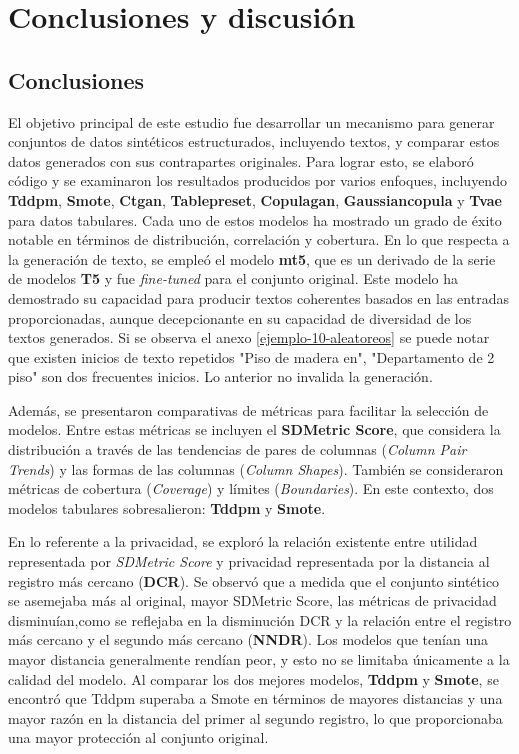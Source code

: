 \chapter{Conclusiones y discusión}

\section{Conclusiones}

El objetivo principal de este estudio fue desarrollar un mecanismo para generar conjuntos de datos sintéticos estructurados, incluyendo textos, y comparar estos datos generados con sus contrapartes originales. Para lograr esto, se elaboró código y se examinaron los resultados producidos por varios enfoques, incluyendo \textbf{Tddpm}, \textbf{Smote}, \textbf{Ctgan}, \textbf{Tablepreset}, \textbf{Copulagan}, \textbf{Gaussiancopula} y \textbf{Tvae} para datos tabulares. Cada uno de estos modelos ha mostrado un grado de éxito notable en términos de distribución, correlación y cobertura. En lo que respecta a la generación de texto, se empleó el modelo \textbf{mt5}, que es un derivado de la serie de modelos \textbf{T5} y fue \emph{fine-tuned} para el conjunto original. Este modelo ha demostrado su capacidad para producir textos coherentes basados en las entradas proporcionadas, aunque decepcionante en su capacidad de diversidad de los textos generados. Si se observa el anexo \ref{ejemplo-10-aleatoreos} se puede notar que existen inicios de texto repetidos "Piso de madera en", "Departamento de 2 piso" son dos frecuentes inicios. Lo anterior no invalida la generación.


Además, se presentaron comparativas de métricas para facilitar la selección de modelos. Entre estas métricas se incluyen el \textbf{SDMetric Score}, que considera la distribución a través de las tendencias de pares de columnas (\emph{Column Pair Trends}) y las formas de las columnas (\emph{Column Shapes}). También se consideraron métricas de cobertura (\emph{Coverage}) y límites (\emph{Boundaries}). En este contexto, dos modelos tabulares sobresalieron: \textbf{Tddpm} y \textbf{Smote}.

En lo referente a la privacidad, se exploró la relación existente entre utilidad representada por \emph{SDMetric Score} y privacidad representada por la distancia al registro más cercano (\textbf{DCR}). Se observó que a medida que el conjunto sintético se asemejaba más al original, mayor SDMetric Score, las métricas de privacidad disminuían,como se reflejaba en la disminución DCR y la relación entre el registro más cercano y el segundo más cercano (\textbf{NNDR}). Los modelos que tenían una mayor distancia generalmente rendían peor, y esto no se limitaba únicamente a la calidad del modelo. Al comparar los dos mejores modelos, \textbf{Tddpm} y \textbf{Smote}, se encontró que Tddpm superaba a Smote en términos de mayores distancias y una mayor razón en la distancia del primer al segundo registro, lo que proporcionaba una mayor protección al conjunto original.

